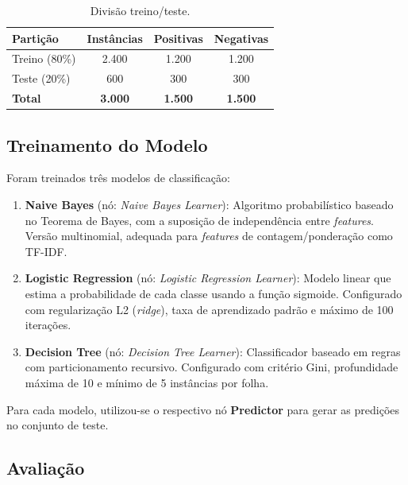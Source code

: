 \documentclass[12pt,a4paper]{article}
\begin{document}
\begin{table}[H]
\centering
\caption{Divisão treino/teste.}
\label{tab:divisao}
\begin{tabular}{lccc}
\toprule
\textbf{Partição} & \textbf{Instâncias} & \textbf{Positivas} & \textbf{Negativas} \\
\midrule
Treino (80\%) & 2.400 & 1.200 & 1.200 \\
Teste (20\%) & 600 & 300 & 300 \\
\midrule
\textbf{Total} & \textbf{3.000} & \textbf{1.500} & \textbf{1.500} \\
\bottomrule
\end{tabular}
\end{table}

\subsection{Treinamento do Modelo}

Foram treinados três modelos de classificação:

\begin{enumerate}[leftmargin=*, label=\textbf{\arabic*.}]
    \item \textbf{Naive Bayes} (nó: \textit{Naive Bayes Learner}): Algoritmo probabilístico baseado no Teorema de Bayes, com a suposição de independência entre \textit{features}. Versão multinomial, adequada para \textit{features} de contagem/ponderação como TF-IDF.

    \item \textbf{Logistic Regression} (nó: \textit{Logistic Regression Learner}): Modelo linear que estima a probabilidade de cada classe usando a função sigmoide. Configurado com regularização L2 (\textit{ridge}), taxa de aprendizado padrão e máximo de 100 iterações.

    \item \textbf{Decision Tree} (nó: \textit{Decision Tree Learner}): Classificador baseado em regras com particionamento recursivo. Configurado com critério Gini, profundidade máxima de 10 e mínimo de 5 instâncias por folha.
\end{enumerate}

Para cada modelo, utilizou-se o respectivo nó \textbf{Predictor} para gerar as predições no conjunto de teste.

\subsection{Avaliação}
\end{document}
